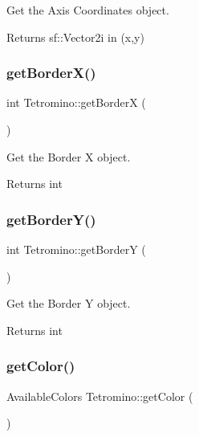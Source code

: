 Get the Axis Coordinates object. 

\begin{DoxyReturn}{Returns}
sf\+::\+Vector2i in (x,y) 
\end{DoxyReturn}
\mbox{\label{classTetromino_aceb82d83a9a0c1d6825855e46c386b20}} 
\subsubsection{\texorpdfstring{get\+Border\+X()}{getBorderX()}}
{\footnotesize\ttfamily int Tetromino\+::get\+BorderX (\begin{DoxyParamCaption}{ }\end{DoxyParamCaption})}



Get the Border X object. 

\begin{DoxyReturn}{Returns}
int 
\end{DoxyReturn}
\mbox{\label{classTetromino_a9ab14cf7ce0a87d9102c6b04f6f2f995}} 
\subsubsection{\texorpdfstring{get\+Border\+Y()}{getBorderY()}}
{\footnotesize\ttfamily int Tetromino\+::get\+BorderY (\begin{DoxyParamCaption}{ }\end{DoxyParamCaption})}



Get the Border Y object. 

\begin{DoxyReturn}{Returns}
int 
\end{DoxyReturn}
\mbox{\label{classTetromino_ad5594cc33ab35ec97b8eb3593e74b787}} 
\subsubsection{\texorpdfstring{get\+Color()}{getColor()}}
{\footnotesize\ttfamily Available\+Colors Tetromino\+::get\+Color (\begin{DoxyParamCaption}{ }\end{DoxyParamCaption})}



